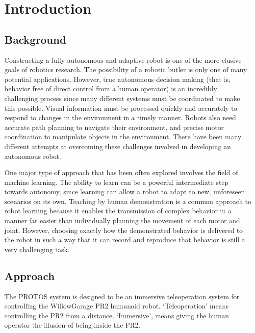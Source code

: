 \documentclass{sig-alternate}
\begin{document}
\section{Introduction}
\label{sec:intro}
\subsection{Background}
\indent Constructing a fully autonomous and adaptive robot is one of the more
elusive goals of robotics research.
The possibility of a robotic butler is only one of many potential applications.
However, true autonomous decision making (that is, behavior free of direct 
control from a human operator) is an incredibly challenging process since many 
different systems must 
be coordinated to make this possible. Visual information must be processed 
quickly and accurately to respond to changes in the environment in a timely
manner. Robots also need accurate path planning to navigate their environment,
 and precise motor coordination to manipulate objects in the environment. 
 There have been many different attempts at overcoming these challenges 
involved in developing an autonomous robot.

\indent One major type of approach 
that has been often explored involves the field of machine learning. The ability to learn can be a powerful intermediate 
step towards autonomy, since learning can allow a robot to adapt to new, unforeseen scenarios on its own. 
Teaching by human demonstration is a common approach to robot learning because it enables the 
transmission of complex behavior in a manner far easier than individually planning the movement of each motor and joint. However, choosing exactly how the demonstrated behavior is delivered to the robot in such a way that it can record and reproduce that behavior is still a very challenging task.

\subsection{Approach}
\indent The PROTOS system is designed to be an immersive teleoperation system for controlling the WillowGarage PR2 humanoid robot. `Teleoperation' means controlling the PR2 from
a distance. `Immersive', means giving the human operator the illusion of being inside the PR2.
\end{document}

